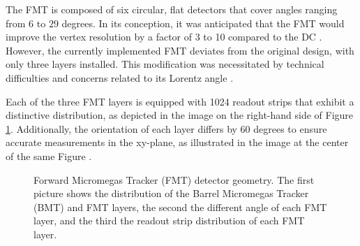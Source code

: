     The FMT is composed of six circular, flat detectors that cover angles ranging from $6$ to $29$ degrees.
    In its conception, it was anticipated that the FMT would improve the vertex resolution by a factor of 3 to 10 compared to the DC \cite{aune2009}.
    However, the currently implemented FMT deviates from the original design, with only three layers installed.
    This modification was necessitated by technical difficulties and concerns related to its Lorentz angle \cite{konczykowski2010}.

    Each of the three FMT layers is equipped with 1024 readout strips that exhibit a distinctive distribution, as depicted in the image on the right-hand side of Figure \ref{fig::12.10::fmt_geometry}.
    Additionally, the orientation of each layer differs by 60 degrees to ensure accurate measurements in the xy-plane, as illustrated in the image at the center of the same Figure \cite{acker2020mvt}.

    \begin{figure}[t]
        \caption[FMT detector geometry.]
        {Forward Micromegas Tracker (FMT) detector geometry.
        The first picture shows the distribution of the Barrel Micromegas Tracker (BMT) and FMT layers, the second the different angle of each FMT layer, and the third the readout strip distribution of each FMT layer.}
        \label{fig::12.10::fmt_geometry}
    \end{figure}

    
